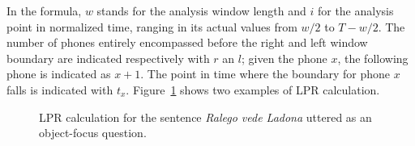 In the formula, $w$ stands for the analysis window length and $i$ for the analysis point in normalized time, ranging in its actual values from $w/2$ to $T-w/2$. The number of phones entirely encompassed before the right and left window boundary are indicated respectively with $r$ an $l$; given the phone $x$, the following phone is indicated as $x+1$. The point in time where the boundary for phone $x$ falls is indicated with $t_{x}$. Figure~\ref{fig403} shows two examples of LPR calculation.

\begin{figure}
\centering
{}
\caption{LPR calculation for the sentence \textit{Ralego vede Ladona} uttered as an object-focus question.}
\label{fig403}\end{figure}

